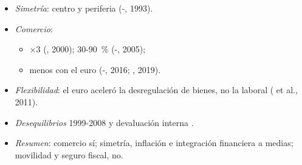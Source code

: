 \documentclass{article}
\begin{document}
\begin{columnas}
\begin{itemize}
\item \emph{Simetría}: centro y periferia (-, 1993).
\item \emph{Comercio}:
  \begin{itemize}
  \item ×3 (, 2000); 30-90~\% (-, 2005);
  \item menos con el euro (-, 2016; , 2019).
  \end{itemize}
\item \emph{Flexibilidad}: el euro aceleró la desregulación de bienes, no la laboral ( et al., 2011).
\item \emph{Desequilibrios} 1999-2008 y devaluación interna .
\item \emph{Resumen}: comercio sí; simetría, inflación e integración financiera a medias; movilidad y seguro fiscal, no.
\end{itemize}


\end{columnas}
\end{document}
